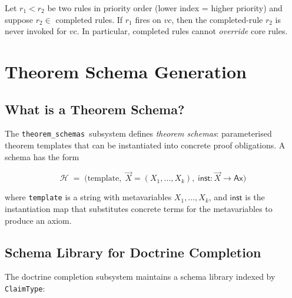 \documentclass[11pt]{article}
\newcommand{\Ax}{\mathsf{Ax}}             %
\newcommand{\VC}{\mathit{vc}}             %
\newcommand{\Schm}{\mathcal{H}}           %
\newcommand{\Inst}{\mathsf{inst}}         %
\newcommand{\TSpkg}{\texttt{theorem\_schemas}}
\begin{document}
\begin{proposition}\label{prop:priority}
Let $r_1 < r_2$ be two rules in priority order (lower index = higher
priority) and suppose $r_2 \in$ completed rules.  If $r_1$ fires on
$\VC$, then the completed-rule $r_2$ is never invoked for $\VC$.
In particular, completed rules cannot \emph{override} core rules.
\end{proposition}

\section{Theorem Schema Generation}\label{sec:schemas}

\subsection{What is a Theorem Schema?}

The \TSpkg\ subsystem defines \emph{theorem schemas}: parameterised
theorem templates that can be instantiated into concrete proof
obligations.  A schema has the form

\[
  \Schm
  \;=\;
  \bigl(\text{template},\;
        \vec{X} = (X_1,\ldots,X_k),\;
        \Inst\colon \vec{X} \to \Ax
  \bigr)
\]

where \texttt{template} is a string with metavariables $X_1,\ldots,X_k$,
and $\Inst$ is the instantiation map that substitutes concrete terms
for the metavariables to produce an axiom.

\subsection{Schema Library for Doctrine Completion}

The doctrine completion subsystem maintains a schema library indexed by
\texttt{ClaimType}:
\end{document}
